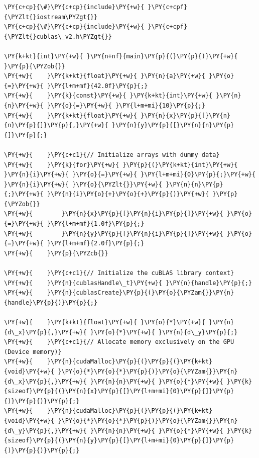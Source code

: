 \begin{Verbatim}[label=\makebox{\url{https://github.com/lucabaldini/cmepda/tree/master/slides/latex/snippets/cublas_saxpy.cpp}},commandchars=\\\{\}]
\PY{c+cp}{\#}\PY{c+cp}{include}\PY{+w}{ }\PY{c+cpf}{\PYZlt{}iostream\PYZgt{}}
\PY{c+cp}{\#}\PY{c+cp}{include}\PY{+w}{ }\PY{c+cpf}{\PYZlt{}cublas\_v2.h\PYZgt{}}

\PY{k+kt}{int}\PY{+w}{ }\PY{n+nf}{main}\PY{p}{(}\PY{p}{)}\PY{+w}{ }\PY{p}{\PYZob{}}
\PY{+w}{    }\PY{k+kt}{float}\PY{+w}{ }\PY{n}{a}\PY{+w}{ }\PY{o}{=}\PY{+w}{ }\PY{l+m+mf}{42.0f}\PY{p}{;}
\PY{+w}{    }\PY{k}{const}\PY{+w}{ }\PY{k+kt}{int}\PY{+w}{ }\PY{n}{n}\PY{+w}{ }\PY{o}{=}\PY{+w}{ }\PY{l+m+mi}{10}\PY{p}{;}
\PY{+w}{    }\PY{k+kt}{float}\PY{+w}{ }\PY{n}{x}\PY{p}{[}\PY{n}{n}\PY{p}{]}\PY{p}{,}\PY{+w}{ }\PY{n}{y}\PY{p}{[}\PY{n}{n}\PY{p}{]}\PY{p}{;}

\PY{+w}{    }\PY{c+c1}{// Initialize arrays with dummy data}
\PY{+w}{    }\PY{k}{for}\PY{+w}{ }\PY{p}{(}\PY{k+kt}{int}\PY{+w}{ }\PY{n}{i}\PY{+w}{ }\PY{o}{=}\PY{+w}{ }\PY{l+m+mi}{0}\PY{p}{;}\PY{+w}{ }\PY{n}{i}\PY{+w}{ }\PY{o}{\PYZlt{}}\PY{+w}{ }\PY{n}{n}\PY{p}{;}\PY{+w}{ }\PY{n}{i}\PY{o}{+}\PY{o}{+}\PY{p}{)}\PY{+w}{ }\PY{p}{\PYZob{}}
\PY{+w}{        }\PY{n}{x}\PY{p}{[}\PY{n}{i}\PY{p}{]}\PY{+w}{ }\PY{o}{=}\PY{+w}{ }\PY{l+m+mf}{1.0f}\PY{p}{;}
\PY{+w}{        }\PY{n}{y}\PY{p}{[}\PY{n}{i}\PY{p}{]}\PY{+w}{ }\PY{o}{=}\PY{+w}{ }\PY{l+m+mf}{2.0f}\PY{p}{;}
\PY{+w}{    }\PY{p}{\PYZcb{}}

\PY{+w}{    }\PY{c+c1}{// Initialize the cuBLAS library context}
\PY{+w}{    }\PY{n}{cublasHandle\_t}\PY{+w}{ }\PY{n}{handle}\PY{p}{;}
\PY{+w}{    }\PY{n}{cublasCreate}\PY{p}{(}\PY{o}{\PYZam{}}\PY{n}{handle}\PY{p}{)}\PY{p}{;}

\PY{+w}{    }\PY{k+kt}{float}\PY{+w}{ }\PY{o}{*}\PY{+w}{ }\PY{n}{d\_x}\PY{p}{,}\PY{+w}{ }\PY{o}{*}\PY{+w}{ }\PY{n}{d\_y}\PY{p}{;}
\PY{+w}{    }\PY{c+c1}{// Allocate memory exclusively on the GPU (Device memory)}
\PY{+w}{    }\PY{n}{cudaMalloc}\PY{p}{(}\PY{p}{(}\PY{k+kt}{void}\PY{+w}{ }\PY{o}{*}\PY{o}{*}\PY{p}{)}\PY{o}{\PYZam{}}\PY{n}{d\_x}\PY{p}{,}\PY{+w}{ }\PY{n}{n}\PY{+w}{ }\PY{o}{*}\PY{+w}{ }\PY{k}{sizeof}\PY{p}{(}\PY{n}{x}\PY{p}{[}\PY{l+m+mi}{0}\PY{p}{]}\PY{p}{)}\PY{p}{)}\PY{p}{;}
\PY{+w}{    }\PY{n}{cudaMalloc}\PY{p}{(}\PY{p}{(}\PY{k+kt}{void}\PY{+w}{ }\PY{o}{*}\PY{o}{*}\PY{p}{)}\PY{o}{\PYZam{}}\PY{n}{d\_y}\PY{p}{,}\PY{+w}{ }\PY{n}{n}\PY{+w}{ }\PY{o}{*}\PY{+w}{ }\PY{k}{sizeof}\PY{p}{(}\PY{n}{y}\PY{p}{[}\PY{l+m+mi}{0}\PY{p}{]}\PY{p}{)}\PY{p}{)}\PY{p}{;}


\end{Verbatim}

